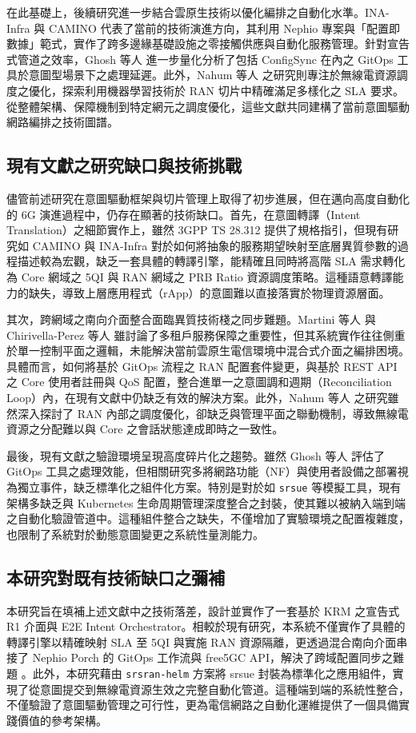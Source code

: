 在此基礎上，後續研究進一步結合雲原生技術以優化編排之自動化水準。INA-Infra \cite{tran2024ina} 與 CAMINO \cite{antonakoglou2025camino} 代表了當前的技術演進方向，其利用 Nephio 專案與「配置即數據」範式，實作了跨多邊緣基礎設施之零接觸供應與自動化服務管理。針對宣告式管道之效率，Ghosh 等人 \cite{ghosh2025performance} 進一步量化分析了包括 ConfigSync 在內之 GitOps 工具於意圖型場景下之處理延遲。此外，Nahum 等人 \cite{nahum2025intent} 之研究則專注於無線電資源調度之優化，探索利用機器學習技術於 RAN 切片中精確滿足多樣化之 SLA 要求。從整體架構、保障機制到特定網元之調度優化，這些文獻共同建構了當前意圖驅動網路編排之技術圖譜。

\subsection{現有文獻之研究缺口與技術挑戰}

儘管前述研究在意圖驅動框架與切片管理上取得了初步進展，但在邁向高度自動化的 6G 演進過程中，仍存在顯著的技術缺口。首先，在意圖轉譯（Intent Translation）之細節實作上，雖然 3GPP TS 28.312 提供了規格指引，但現有研究如 CAMINO \cite{antonakoglou2025camino} 與 INA-Infra \cite{tran2024ina} 對於如何將抽象的服務期望映射至底層異質參數的過程描述較為宏觀，缺乏一套具體的轉譯引擎，能精確且同時將高階 SLA 需求轉化為 Core 網域之 5QI 與 RAN 網域之 PRB Ratio 資源調度策略。這種語意轉譯能力的缺失，導致上層應用程式（rApp）的意圖難以直接落實於物理資源層面。

其次，跨網域之南向介面整合面臨異質技術棧之同步難題。Martini 等人 \cite{martini2023intent} 與 Chirivella-Perez 等人 \cite{chirivella2023e2e} 雖討論了多租戶服務保障之重要性，但其系統實作往往側重於單一控制平面之邏輯，未能解決當前雲原生電信環境中混合式介面之編排困境。具體而言，如何將基於 GitOps 流程之 RAN 配置套件變更，與基於 REST API 之 Core 使用者註冊與 QoS 配置，整合進單一之意圖調和週期（Reconciliation Loop）內，在現有文獻中仍缺乏有效的解決方案。此外，Nahum 等人 \cite{nahum2025intent} 之研究雖然深入探討了 RAN 內部之調度優化，卻缺乏與管理平面之聯動機制，導致無線電資源之分配難以與 Core 之會話狀態達成即時之一致性。

最後，現有文獻之驗證環境呈現高度碎片化之趨勢。雖然 Ghosh 等人 \cite{ghosh2025performance} 評估了 GitOps 工具之處理效能，但相關研究多將網路功能（NF）與使用者設備之部署視為獨立事件，缺乏標準化之組件化方案。特別是對於如 \texttt{srsue} 等模擬工具，現有架構多缺乏與 Kubernetes 生命周期管理深度整合之封裝，使其難以被納入端到端之自動化驗證管道中。這種組件整合之缺失，不僅增加了實驗環境之配置複雜度，也限制了系統對於動態意圖變更之系統性量測能力。

\subsection{本研究對既有技術缺口之彌補}
本研究旨在填補上述文獻中之技術落差，設計並實作了一套基於 KRM 之宣告式 R1 介面與 E2E Intent Orchestrator。相較於現有研究，本系統不僅實作了具體的轉譯引擎以精確映射 SLA 至 5QI 與實施 RAN 資源隔離，更透過混合南向介面串接了 Nephio Porch 的 GitOps 工作流與 free5GC API，解決了跨域配置同步之難題 \cite{tran2024ina}。此外，本研究藉由 \texttt{srsran-helm} 方案將 srsue 封裝為標準化之應用組件，實現了從意圖提交到無線電資源生效之完整自動化管道。這種端到端的系統性整合，不僅驗證了意圖驅動管理之可行性，更為電信網路之自動化運維提供了一個具備實踐價值的參考架構。
